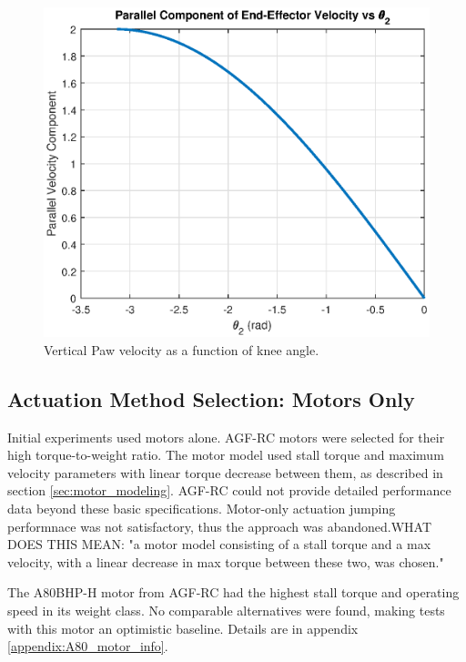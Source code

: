 \begin{figure}[h]
    \centering
    \includegraphics[width=\textwidth]{Images/vertical_paw_velocity.eps}
    \caption{Vertical Paw velocity as a function of knee angle.}
    \label{fig:vertical_jacobian_velocity}
\end{figure}

\subsection{Actuation Method Selection: Motors Only}
\label{sec:design_motor_only_jumps}

Initial experiments used motors alone. AGF-RC motors were selected for their high torque-to-weight ratio. The motor model used stall torque and maximum velocity parameters with linear torque decrease between them, as described in section \ref{sec:motor_modeling}. AGF-RC could not provide detailed performance data beyond these basic specifications. Motor-only actuation jumping performnace was not satisfactory, thus the approach was abandoned.WHAT DOES THIS MEAN: "a motor model consisting of a stall torque and a max 
velocity, with a linear decrease in max torque between these two, was chosen."

The A80BHP-H motor from AGF-RC had the highest stall torque and operating speed in its weight class. No comparable alternatives were found, making tests with this motor an optimistic baseline. Details are in appendix \ref{appendix:A80_motor_info}.

